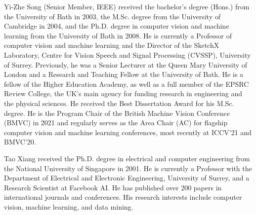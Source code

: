 \documentclass[journal]{IEEEtran}
\begin{document}
\begin{IEEEbiography}{Yi-Zhe Song}
(Senior Member, IEEE) received the bachelor’s degree (Hons.) from the University of Bath in 2003, the M.Sc. degree from the University of Cambridge in 2004, and the Ph.D. degree in computer vision and machine learning from the University of Bath in 2008. He is currently a Professor of computer vision and machine learning and the Director of the SketchX Laboratory, Centre for Vision Speech and Signal Processing (CVSSP), University of Surrey. Previously, he was a Senior Lecturer at the Queen Mary University of London and a Research and Teaching Fellow at the University of Bath. He is a fellow of the Higher Education Academy, as well as a full member of the EPSRC Review College, the UK’s main agency for funding research in engineering and the physical sciences. He received the Best Dissertation Award for his M.Sc. degree. He is the Program Chair of the British Machine Vision Conference (BMVC) in 2021 and regularly serves as the Area Chair (AC) for flagship computer vision and machine learning conferences, most recently at ICCV’21 and BMVC’20.
\end{IEEEbiography}

\begin{IEEEbiography}{Tao Xiang}
received the Ph.D. degree in electrical and computer engineering from the National University of Singapore in 2001. He is currently a Professor with the Department of Electrical and Electronic Engineering, University of Surrey, and a Research Scientist at Facebook AI. He has published over 200 papers in international journals and conferences. His research interests include computer vision, machine learning, and data mining.
\end{IEEEbiography}


\vfill
\end{document}
